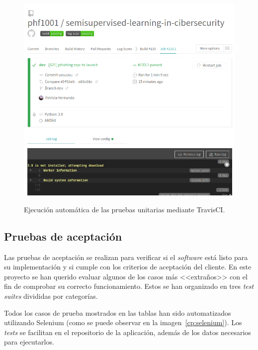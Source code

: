 \begin{figure}[h]
	\caption[TravisCI: ejecución automática de pruebas unitarias]{Ejecución automática de las pruebas unitarias mediante TravisCI.}
	\centering
	\includegraphics[width=\textwidth]{../img/anexos/cp/travis-tests}
	\label{d:cp-travis}
\end{figure}


\subsection{Pruebas de aceptación}
\label{s:pruebas-aceptación}

Las pruebas de aceptación se realizan para verificar si el \textit{software} está listo para su implementación y si cumple con los criterios de aceptación del cliente. En este proyecto se han querido evaluar algunos de los casos más <<extraños>> con el fin de comprobar su correcto funcionamiento. Estos se han organizado en tres \textit{test suites} divididas por categorías.

Todos los casos de prueba mostrados en las tablas han sido automatizados utilizando Selenium (como se puede observar en la imagen~\ref{cp:selenium}). Los \textit{tests} se facilitan en el repositorio de la aplicación, además de los datos necesarios para ejecutarlos.

